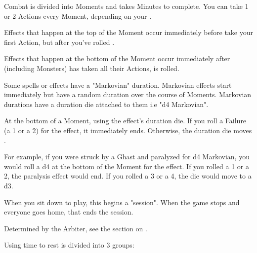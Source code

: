 {\begin{multicols*}{2}

Combat is divided into Moments and takes Minutes to complete.  You can take 1 or 2 Actions every Moment, depending on your .


Effects that happen at the top of the Moment occur immediately before  take your first Action, but after you've rolled .

Effects that happen at the bottom of the Moment occur immediately after  (including Monsters) has taken all their Actions,   is rolled.



Some spells or effects have a "Markovian" duration.  Markovian effects start immediately but have a random duration over the course of Moments. Markovian durations have a duration die attached to them i.e "d4 Markovian".

At the bottom of a Moment, \RS using the effect's duration die.  If you roll a Failure (a 1 or a 2) for the effect, it immediately ends.  Otherwise, the duration die moves \DCDOWN. 

For example, if you were struck by a Ghast and paralyzed for d4 Markovian, you would roll a d4 at the bottom of the Moment for the effect.  If you rolled a 1 or a 2, the paralysis effect would end.  If you rolled a 3 or a 4, the die would move to a d3.


When you sit down to play, this begins a "session".  When the game stops and everyone goes home, that ends the session.  

\cbreak\bump


Determined by the Arbiter, see the section on .


Using time to rest is divided into 3 groups:





\end{multicols*}}
